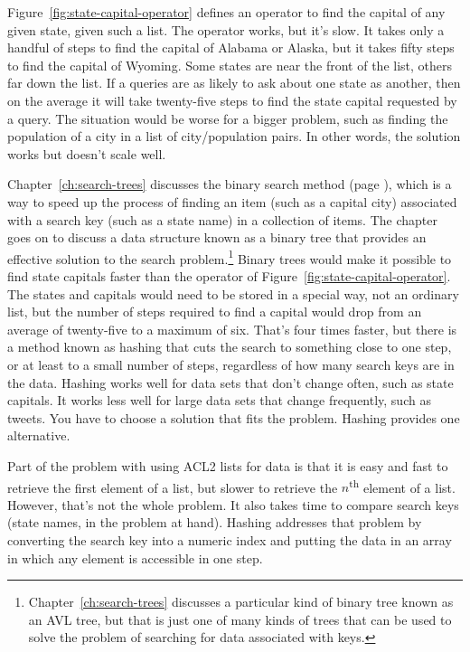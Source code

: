 Figure~\ref{fig:state-capital-operator}
defines an operator to find the
capital of any given state, given such a list.
The operator works, but it's slow.
It takes only a handful of steps to find the capital of Alabama or
Alaska, but it takes fifty steps to find the capital of Wyoming.
Some states are near the front of the list,
others far down the list.
If a queries are as likely to ask about
one state as another,
then on the average it will take twenty-five steps to find
the state capital requested by a query.
The situation would be worse for a bigger problem,
such as finding the population of a city in a list of city/population pairs.
In other words, the solution works but doesn't scale well.

Chapter~\ref{ch:search-trees} discusses the binary search
method (page \pageref{binary-search-method}),
which is a way to speed up the process of finding an item
(such as a capital city)
associated with a search key (such as a state name) in a
collection of items. The chapter goes on to discuss
a data structure known as a binary tree
that provides an effective solution to the search 
problem.\footnote{Chapter~\ref{ch:search-trees}
discusses a particular kind of binary tree known as an AVL tree,
but that is just one of many kinds of trees
that can be used to solve the problem of searching
for data associated with keys.}
Binary trees would make it possible to find
state capitals faster
than the operator of Figure~\ref{fig:state-capital-operator}.
The states and capitals would need to be stored
in a special way, not an ordinary list,
but the number of steps required to find a capital
would drop from an average of twenty-five to a maximum of six.
That's four times faster, but there is a method known as hashing
that cuts the search to something close to one step, or at least
to a small number of steps, regardless of how
many search keys are in the data.
Hashing works well for data sets that don't change often,
such as state capitals. It works less well for large
data sets that change frequently, such as tweets.
You have to choose a solution that fits the problem.
Hashing provides one alternative.

Part of the problem with using ACL2 lists
for data is that it is easy and fast to retrieve the
first element of a list, but slower to retrieve the
$n$\textsuperscript{th} element of a list.
However, that's not the whole problem.
It also takes time to compare search keys
(state names, in the problem at hand).
Hashing addresses that problem by converting the search key
into a numeric index and putting the data
in an array in which any element is accessible
in one step.

